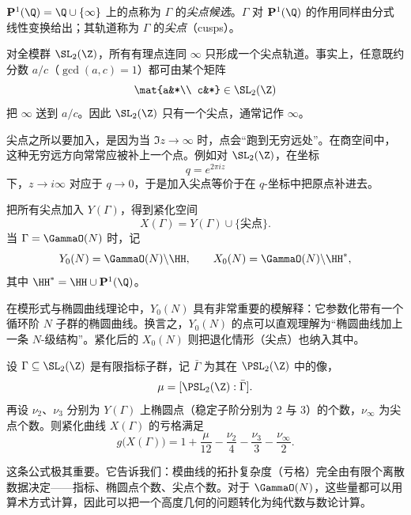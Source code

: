 \begin{definition}
$\mathbf P^1(\Q)=\Q\cup\{\infty\}$ 上的点称为 $\Gamma$ 的\emph{尖点候选}。$\Gamma$ 对 $\mathbf P^1(\Q)$ 的作用同样由分式线性变换给出；其轨道称为 $\Gamma$ 的\emph{尖点}（cusps）。
\end{definition}

\begin{example}
对全模群 $\SL_2(\Z)$，所有有理点连同 $\infty$ 只形成一个尖点轨道。事实上，任意既约分数 $a/c$（$\gcd(a,c)=1$）都可由某个矩阵
\[
\mat{a&*\\ c&*}\in \SL_2(\Z)
\]
把 $\infty$ 送到 $a/c$。因此 $\SL_2(\Z)$ 只有一个尖点，通常记作 $\infty$。
\end{example}

\begin{remark}
尖点之所以要加入，是因为当 $\Im z\to\infty$ 时，点会“跑到无穷远处”。在商空间中，这种无穷远方向常常应被补上一个点。例如对 $\SL_2(\Z)$，在坐标
\[
q=e^{2\pi i z}
\]
下，$z\to i\infty$ 对应于 $q\to 0$，于是加入尖点等价于在 $q$-坐标中把原点补进去。
\end{remark}

\begin{definition}
把所有尖点加入 $Y(\Gamma)$，得到紧化空间
\[
X(\Gamma)=Y(\Gamma)\cup\{\text{尖点}\}.
\]
当 $\Gamma=\GammaO(N)$ 时，记
\[
Y_0(N)=\GammaO(N)\backslash \HH,
\qquad
X_0(N)=\GammaO(N)\backslash \HH^{\ast},
\]
其中 $\HH^{\ast}=\HH\cup \mathbf P^1(\Q)$。
\end{definition}

\begin{remark}
在模形式与椭圆曲线理论中，$Y_0(N)$ 具有非常重要的模解释：它参数化带有一个循环阶 $N$ 子群的椭圆曲线。换言之，$Y_0(N)$ 的点可以直观理解为“椭圆曲线加上一条 $N$-级结构”。紧化后的 $X_0(N)$ 则把退化情形（尖点）也纳入其中。
\end{remark}

\begin{theorem}[亏格公式，陈述]
设 $\Gamma\subseteq \SL_2(\Z)$ 是有限指标子群，记 $\bar\Gamma$ 为其在 $\PSL_2(\Z)$ 中的像，
\[
\mu=[\PSL_2(\Z):\bar\Gamma].
\]
再设 $\nu_2$、$\nu_3$ 分别为 $Y(\Gamma)$ 上椭圆点（稳定子阶分别为 $2$ 与 $3$）的个数，$\nu_{\infty}$ 为尖点个数。则紧化曲线 $X(\Gamma)$ 的亏格满足
\[
g\bigl(X(\Gamma)\bigr)=1+\frac{\mu}{12}-\frac{\nu_2}{4}-\frac{\nu_3}{3}-\frac{\nu_{\infty}}{2}.
\]
\end{theorem}

\begin{remark}
这条公式极其重要。它告诉我们：模曲线的拓扑复杂度（亏格）完全由有限个离散数据决定——指标、椭圆点个数、尖点个数。对于 $\GammaO(N)$，这些量都可以用算术方式计算，因此可以把一个高度几何的问题转化为纯代数与数论计算。
\end{remark}

